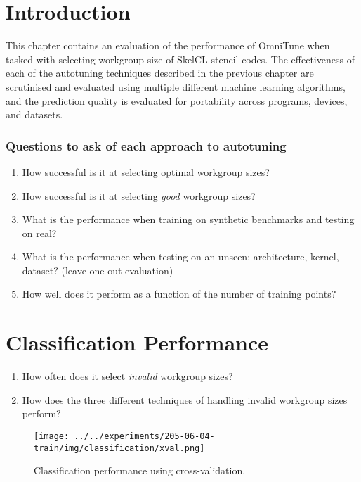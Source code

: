 \section{Introduction}

This chapter contains an evaluation of the performance of OmniTune
when tasked with selecting workgroup size of SkelCL stencil codes. The
effectiveness of each of the autotuning techniques described in the
previous chapter are scrutinised and evaluated using multiple
different machine learning algorithms, and the prediction quality is
evaluated for portability across programs, devices, and datasets.


\subsubsection{Questions to ask of each approach to autotuning}

\begin{enumerate}
\item How successful is it at selecting optimal workgroup sizes?
\item How successful is it at selecting \emph{good} workgroup sizes?
\item What is the performance when training on synthetic benchmarks
  and testing on real?
\item What is the performance when testing on an unseen: architecture,
  kernel, dataset? (leave one out evaluation)
\item How well does it perform as a function of the number of training
  points?
\end{enumerate}

\section{Classification Performance}

\begin{enumerate}
\item How often does it select \emph{invalid} workgroup sizes?
\item How does the three different techniques of handling invalid
  workgroup sizes perform?
\end{enumerate}

\begin{figure}
\centering
\texttt{[image: ../../experiments/205-06-04-train/img/classification/xval.png]}
\caption{%
  Classification performance using cross-validation.%
}
\end{figure}

